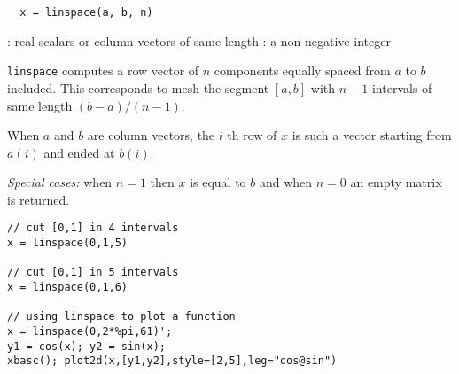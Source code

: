 \begin{mandesc}
\end{mandesc}
\begin{calling_sequence}
\begin{verbatim}
  x = linspace(a, b, n)
\end{verbatim}
\end{calling_sequence}

\begin{parameters}
  \begin{varlist}
    : real scalars or column vectors of same length
    : a non negative integer
  \end{varlist}
\end{parameters}
\begin{mandescription}
  \verb+linspace+ computes a row vector of $n$ components equally spaced from $a$ to $b$ included. This
  corresponds to mesh the segment $[a,b]$ with $n-1$ intervals of same length $(b-a)/(n-1)$.

   When $a$ and $b$ are column vectors, the $i$ th row of $x$ is such a vector starting from $a(i)$ and ended
  at $b(i)$.

  {\em Special cases: } when $n=1$ then $x$ is equal to $b$ and when $n=0$ an empty matrix is returned.
\end{mandescription}

\begin{examples}
\begin{Verbatim}
// cut [0,1] in 4 intervals   
x = linspace(0,1,5)

// cut [0,1] in 5 intervals   
x = linspace(0,1,6)

// using linspace to plot a function   
x = linspace(0,2*%pi,61)';
y1 = cos(x); y2 = sin(x);
xbasc(); plot2d(x,[y1,y2],style=[2,5],leg="cos@sin")
\end{Verbatim}

\end{examples}

\begin{manseealso}
\end{manseealso}

